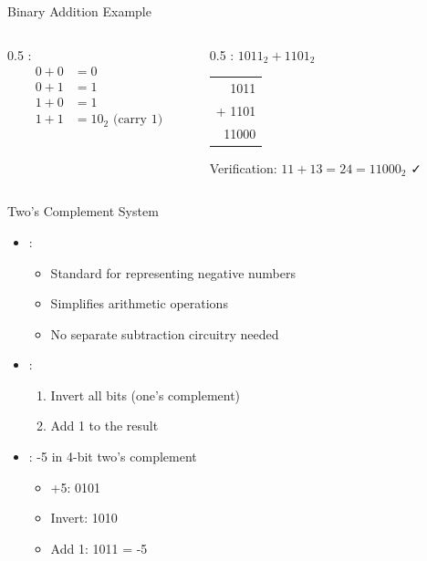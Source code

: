 \begin{frame}{Binary Addition Example}
\begin{columns}
\begin{column}{0.5\textwidth}
:
\begin{align}
0 + 0 &= 0\\
0 + 1 &= 1\\
1 + 0 &= 1\\
1 + 1 &= 10_2 \text{ (carry 1)}
\end{align}
\end{column}
\begin{column}{0.5\textwidth}
: $1011_2 + 1101_2$
\begin{center}
\begin{tabular}{r}
  1011 \\
+ 1101 \\
\hline
 11000 \\
\end{tabular}
\end{center}
Verification: $11 + 13 = 24 = 11000_2$ ✓
\end{column}
\end{columns}
\end{frame}

\begin{frame}{Two's Complement System}
\begin{itemize}
\item {}:
\begin{itemize}
\item Standard for representing negative numbers
\item Simplifies arithmetic operations
\item No separate subtraction circuitry needed
\end{itemize}
\vspace{0.5cm}
\item {}:
\begin{enumerate}
\item Invert all bits (one's complement)
\item Add 1 to the result
\end{enumerate}
\vspace{0.3cm}
\item {}: -5 in 4-bit two's complement
\begin{itemize}
\item +5: 0101
\item Invert: 1010
\item Add 1: 1011 = -5
\end{itemize}
\end{itemize}
\end{frame}

